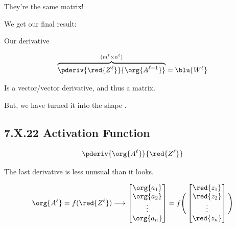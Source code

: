         They're the same matrix!
            
        We get our final result:\\
        
        
        \begin{notation}
            Our derivative
            
            \begin{equation*}
                \overbrace{
                    \pderiv{\red{Z^\ell}} {\org{A^{\ell-1}}}
                }^{ (m^{\ell} \times n^{\ell}) }
                =
                \blu{W^\ell}
            \end{equation*}
        
            Is a vector/vector derivative, and thus a matrix.
            
            But, we have turned it into the shape .
        \end{notation}
            
           
    \secdiv  
         
    \subsection*{7.X.22 \quad Activation Function}
        
        \begin{equation}
            \pderiv {\org{A^\ell}}   {\red{Z^\ell}}
        \end{equation}
    
        The last derivative is less unusual than it looks.
        
        \begin{equation}
            \org{A^\ell} = f( \red{Z^\ell} ) 
            \longrightarrow
            \begin{bmatrix}
                \org{a_1}\\ \org{a_2}\\ \vdots \\ \org{a_n}
            \end{bmatrix}
            =
            f
            \Bigg(
            \begin{bmatrix}
                \red{z_1}\\\red{z_2}\\ \vdots \\ \red{z_n}
            \end{bmatrix}
            \Bigg)
        \end{equation}
        
